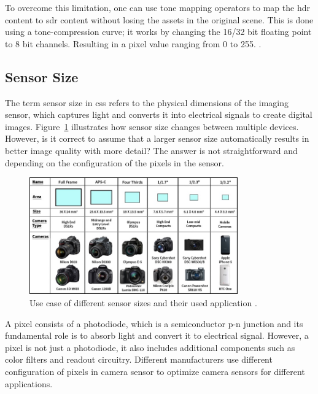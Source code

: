 To overcome this limitation, one can use tone mapping operators to map the \gls{hdr} content to \gls{sdr} content without losing the assets in the original scene. This is done using a tone-compression curve; it works by changing the 16/32 bit floating point to 8 bit channels. Resulting in a pixel value ranging from 0 to 255. \cite{HDR}.

\subsection{Sensor Size}
The term sensor size in \gls{cs}s refers to the physical dimensions of the imaging sensor, which captures light and converts it into electrical signals to create digital images. Figure~\ref{Sen_Size_chart} illustrates how sensor size changes between multiple devices. However, is it correct to assume that a larger sensor size automatically results in better image quality with more detail? The answer is not straightforward and depending on the configuration of the pixels in the sensor. 

\begin{figure}[ht]
    \centering
    \includegraphics[width=0.8\textwidth]{Figures/sensor-chart.jpg}  
    \caption{Use case of different sensor sizes and their used application \cite{Sen_size_chart}.}
    \label{Sen_Size_chart}
\end{figure}

A pixel consists of a photodiode, which is a semiconductor p-n junction and its fundamental role is to absorb light and convert it to electrical signal.  However, a pixel is not just a photodiode, it also includes additional components such as color filters and readout circuitry. Different manufacturers use different configuration of pixels in camera sensor to optimize camera sensors for different applications.

